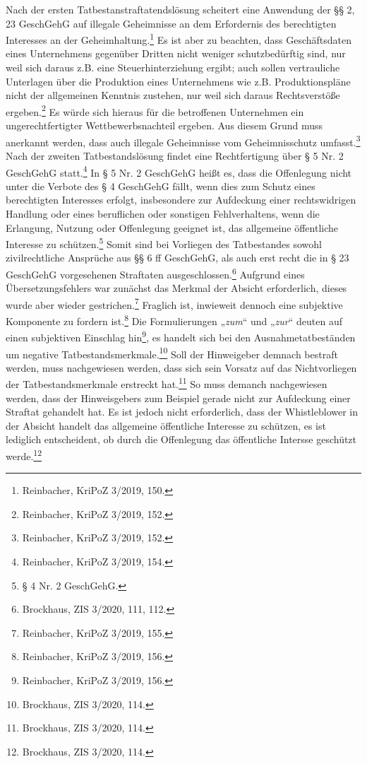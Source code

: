 Nach der ersten Tatbestanstraftatendslösung scheitert eine Anwendung der §§ 2, 23 GeschGehG auf illegale Geheimnisse an dem Erfordernis des berechtigten Interesses an der Geheimhaltung.\footnote{Reinbacher, KriPoZ 3/2019, 150.}
Es ist aber zu beachten, dass Geschäftsdaten eines Unternehmens gegenüber Dritten nicht weniger schutzbedürftig sind, nur weil sich daraus z.B. eine Steuerhinterziehung ergibt; auch sollen vertrauliche Unterlagen über die Produktion eines Unternehmens wie z.B. Produktionspläne nicht der allgemeinen Kenntnis zustehen, nur weil sich daraus Rechtsverstöße ergeben.\footnote{Reinbacher, KriPoZ 3/2019, 152.}
Es würde sich hieraus für die betroffenen Unternehmen ein ungerechtfertigter Wettbewerbsnachteil ergeben.
Aus diesem Grund muss anerkannt werden, dass auch illegale Geheimnisse vom Geheimnisschutz umfasst.\footnote{Reinbacher, KriPoZ 3/2019, 152.}\\
Nach der zweiten Tatbestandslösung findet eine Rechtfertigung über § 5 Nr. 2 GeschGehG statt.\footnote{Reinbacher, KriPoZ 3/2019, 154.}
In § 5 Nr. 2 GeschGehG heißt es, dass die Offenlegung nicht unter die Verbote des § 4 GeschGehG fällt, wenn dies zum Schutz eines berechtigten Interesses erfolgt, insbesondere zur Aufdeckung einer rechtswidrigen Handlung oder eines beruflichen oder sonstigen Fehlverhaltens, wenn die Erlangung, Nutzung oder Offenlegung geeignet ist, das allgemeine öffentliche Interesse zu schützen.\footnote{§ 4 Nr. 2 GeschGehG.}
Somit sind bei Vorliegen des Tatbestandes sowohl zivilrechtliche Ansprüche aus §§ 6 ff GeschGehG, als auch erst recht die in § 23 GeschGehG vorgesehenen Straftaten ausgeschlossen.\footnote{Brockhaus, ZIS 3/2020, 111, 112.}
Aufgrund eines Übersetzungsfehlers war zunächst das Merkmal der Absicht erforderlich, dieses wurde aber wieder gestrichen.\footnote{Reinbacher, KriPoZ 3/2019, 155.}
Fraglich ist, inwieweit dennoch eine subjektive Komponente zu fordern ist.\footnote{Reinbacher, KriPoZ 3/2019, 156.}
Die Formulierungen „\textit{zum}“ und „\textit{zur}“ deuten auf einen subjektiven Einschlag hin\footnote{Reinbacher, KriPoZ 3/2019, 156.}, es handelt sich bei den Ausnahmetatbeständen um negative Tatbestandsmerkmale.\footnote{Brockhaus, ZIS 3/2020, 114.}
Soll der Hinweigeber demnach bestraft werden, muss nachgewiesen werden, dass sich sein Vorsatz auf das Nichtvorliegen der Tatbestandsmerkmale erstreckt hat.\footnote{Brockhaus, ZIS 3/2020, 114.}
So muss demanch nachgewiesen werden, dass der Hinweisgebers zum Beispiel gerade nicht zur Aufdeckung einer Straftat gehandelt hat.
Es ist  jedoch nicht erforderlich, dass der Whistleblower in der Absicht handelt das allgemeine öffentliche Interesse zu schützen, es ist lediglich entscheident, ob durch die Offenlegung das öffentliche Intersse geschützt werde.\footnote{Brockhaus, ZIS 3/2020, 114.} \\
